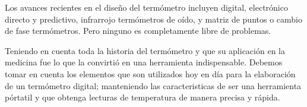 \par \noindent
Los avances recientes en el diseño del termómetro incluyen
digital, electrónico directo y predictivo, infrarrojo
termómetros de oído, y matriz de puntos o cambio de fase
termómetros. Pero ninguno es completamente libre de
problemas.\cite{intro-historia}

\par \noindent
Teniendo en cuenta toda la historia del termómetro y que su aplicación en la medicina fue lo que la convirtió en una herramienta indispensable. Debemos tomar en cuenta los elementos que son utilizados hoy en día para la elaboración de un termómetro digital; manteniendo las caracteristicas de ser una herramienta pórtatil y que obtenga lecturas de temperatura de manera precisa y rápida.